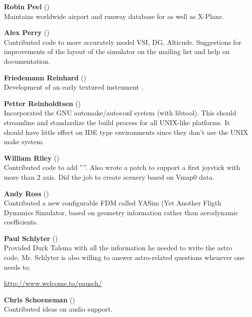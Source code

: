 \noindent \textbf{Robin Peel} ()\\
  Maintains worldwide airport and runway database for \FlightGear{} as well as X-Plane.
 \medskip

\noindent \textbf{Alex Perry} ()\\
 Contributed code to more accurately model VSI, DG, Alticude.
 Suggestions for improvements of the layout of the simulator on the mailing list
 and help on documentation.
 \medskip

\noindent \textbf{Friedemann Reinhard}
()\\
  Development of an early textured instrument .
 \medskip

\noindent \textbf{Petter Reinholdtsen}
()\\
  Incorporated the GNU automake/autoconf system (with libtool).
  This should streamline and standardize the build process for all
  UNIX-like platforms.  It should have little effect on IDE type
  environments since they don't use the UNIX make system.
 \medskip

\noindent \textbf{William Riley} ()\\
  Contributed code to add ''''. Also wrote a patch to support a first
  joystick with more than 2 axis. Did the job to create scenery based on Vmap0 data.
 \medskip
 
\noindent \textbf{Andy Ross} ()\\
 Contributed a new configurable FDM called YASim (Yet Another Fligth Dynamics Simulator, based on geometry information rather than aerodynamic coefficients.
 \medskip

\noindent \textbf{Paul Schlyter} ()\\
  Provided Durk Talsma with all the information he needed to write the
  astro code. Mr. Schlyter is also willing to answer astro-related questions
  whenever one needs to.
  \medskip
  
  \href{http://www.welcome.to/pausch/}{http://www.welcome.to/pausch/}
 \medskip

\noindent \textbf{Chris Schoeneman}
()\\
  Contributed ideas on audio support.
 \medskip

